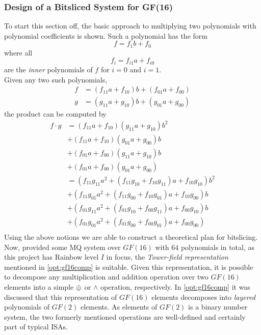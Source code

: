 \subsubsection{Design of a Bitsliced System for GF(16)} \label{bitslice:theory}
To start this section off, the basic approach to multiplying two polynomials with polynomial coefficients is shown. Such a polynomial has the form
$$
    f = f_1b + f_0
$$
where all
$$
    f_i = f_{i1}a+f_{i0}
$$
are the \emph{inner} polynomials of $f$ for $i = 0$ and $i = 1$.\\ 
Given any two such polynomials,
\begin{equation*}
    \begin{split}
        f &= (f_{11}a+f_{10})b + (f_{01}a + f_{00})\\
        g &= (g_{11}a+g_{10})b + (g_{01}a + g_{00})
    \end{split}
\end{equation*}
the product can be computed by
\begin{equation} \label{bitslice:poly}
    \begin{split}
        f \cdot g &= (f_{11}a + f_{10})(g_{11}a + g_{10})b^2\\
        &+ (f_{11} a + f_{10})(g_{01}a + g_{00})b\\ 
        &+ (f_{01}a + f_{00})(g_{11}a + g_{10})b\\ 
        &+ (f_{01} a + f_{00})(g_{01}a + g_{00})\\
        &= (f_{11}g_{11}a^2 + (f_{11}g_{10} + f_{10}g_{11})a + f_{10}g_{10})b^2\\
        &+ (f_{11}g_{01}a^2 + (f_{11}g_{00} + f_{10}g_{01})a + f_{10}g_{00})b\\
        &+ (f_{01}g_{11}a^2 + (f_{01}g_{10} + f_{00}g_{11})a + f_{00}g_{10})b\\
        &+ (f_{01}g_{01}a^2 + (f_{01}g_{00} + f_{00}g_{01})a + f_{00}g_{00})\\
    \end{split}
\end{equation}
Using the above notions we are able to construct a theoretical plan for bitslicing.
\medskip\\
Now, provided some MQ system over $GF(16)$ with $64$ polynomials in total, as this project has Rainbow level $I$ in focus, the \emph{Tower-field representation} mentioned in \cref{opt:gf16comp} is suitable. Given this representation, it is possible to decompose any multiplication and addition operation over two $GF(16)$ elements into a simple $\oplus$ or $\wedge$ operation, respectively. In \cref{opt:gf16comp} it was discussed that this representation of $GF(16)$ elements decomposes into \emph{layered} polynomials of $GF(2)$ elements. As elements of $GF(2)$ is a binary number system, the two formerly mentioned operations are well-defined and certainly part of typical ISAs.\medskip\\
